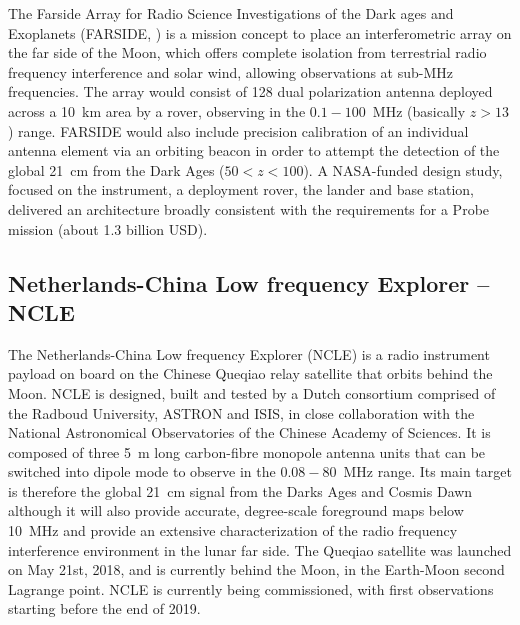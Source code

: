 The Farside Array for Radio Science Investigations of the Dark ages and Exoplanets (FARSIDE, \cite{burns19b}) is a mission concept to place an interferometric array on the far side of the Moon, which offers complete isolation from terrestrial radio frequency interference and solar wind, allowing observations at sub-MHz frequencies. The array would consist of 128 dual polarization antenna deployed across a 10~km area by a rover, observing in the $0.1-100$~MHz (basically $z > 13$) range. FARSIDE would also include precision calibration of an individual antenna element via an orbiting beacon in order to attempt the detection of the global 21~cm from the Dark Ages ($50 < z < 100$).
%
A NASA-funded design study, focused on the instrument, a deployment rover, the lander and base station, delivered an architecture broadly consistent with the requirements for a Probe mission (about 1.3 billion USD).


\subsection{Netherlands-China Low frequency Explorer -- NCLE}

The Netherlands-China Low frequency Explorer (NCLE) is a radio instrument payload on board on the Chinese Queqiao relay satellite that orbits behind the Moon. 
NCLE is designed, built and tested by a Dutch consortium comprised of the Radboud University, ASTRON and ISIS, in close collaboration with the National Astronomical Observatories of the Chinese Academy of Sciences. It is composed of three 5~m long carbon-fibre monopole antenna units that can be switched into dipole mode to observe in the $0.08-80$~MHz range. Its main target is therefore the global 21~cm signal from the Darks Ages and Cosmis Dawn although it will also provide accurate, degree-scale foreground maps below 10~MHz and provide an extensive characterization of the radio frequency interference environment in the lunar far side.
%
The Queqiao satellite was launched on May 21st, 2018, and is currently behind the Moon, in the Earth-Moon second Lagrange point. NCLE is currently being commissioned, with first observations starting before the end of 2019.


